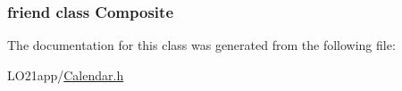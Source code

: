 \subsubsection[{Composite}]{\setlength{\rightskip}{0pt plus 5cm}friend class {\bf Composite}\hspace{0.3cm}{\ttfamily [friend]}}\label{class_composite_1_1_compo_iterator_ace19a20e83d0e04d1929284108a7582d}


The documentation for this class was generated from the following file\+:\begin{DoxyCompactItemize}
\item 
L\+O21app/\hyperlink{_calendar_8h}{Calendar.\+h}\end{DoxyCompactItemize}
